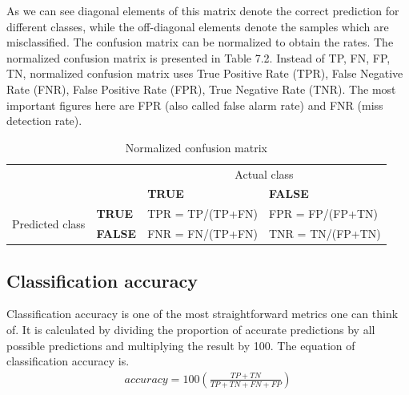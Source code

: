 As we can see diagonal elements of this matrix denote the correct prediction for different classes, while the off-diagonal elements denote the samples which are misclassified.
The confusion matrix can be normalized to obtain the rates. The normalized confusion matrix is presented in Table 7.2. Instead of TP, FN, FP, TN, normalized confusion matrix uses True Positive Rate (TPR), False Negative Rate (FNR), False Positive Rate (FPR), True Negative Rate (TNR). The most important figures here are FPR (also called false alarm rate) and FNR (miss detection rate).

\begin{table}[h!]
	\begin{tabular}{llll}
													   &                            & \multicolumn{2}{c}{Actual class}                                                 \\ \cline{3-4} 
													   & \multicolumn{1}{l|}{}      & \multicolumn{1}{l|}{\textbf{TRUE}}                & \multicolumn{1}{l|}{\textbf{FALSE}}               \\ \cline{2-4} 
	\multicolumn{1}{c|}{\multirow{2}{*}{Predicted class}} & \multicolumn{1}{l|}{\textbf{TRUE}}  & \multicolumn{1}{l|}{TPR = TP/(TP+FN)}  & \multicolumn{1}{l|}{FPR = FP/(FP+TN)} \\ \cline{2-4} 
	\multicolumn{1}{c|}{}                              & \multicolumn{1}{l|}{\textbf{FALSE}} & \multicolumn{1}{l|}{FNR = FN/(TP+FN)} & \multicolumn{1}{l|}{TNR = TN/(FP+TN)}  \\ \cline{2-4} 
	\end{tabular}
	\caption{\label{demo-table} Normalized confusion matrix}
\end{table} 

\subsection{Classification accuracy}
\hspace{0.5cm}Classification accuracy is one of the most straightforward metrics one can think of. It is calculated by dividing the proportion of accurate predictions by all possible predictions and multiplying the result by 100. The equation of classification accuracy is.
\begin{align*}
	accuracy = 100\left (\frac{TP + TN}{TP + TN + FN + FP}  \right )
\end{align*}

